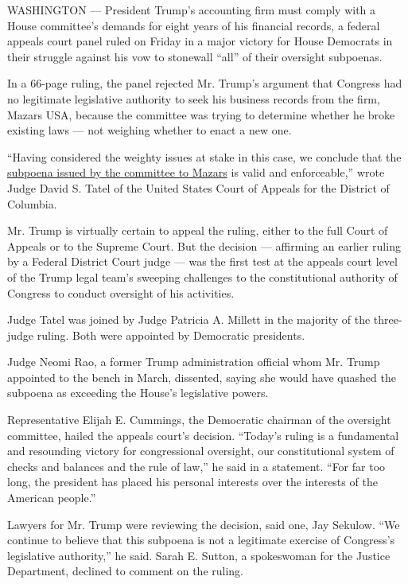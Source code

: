 WASHINGTON --- President Trump's accounting firm must comply with a
House committee's demands for eight years of his financial records, a
federal appeals court panel ruled on Friday in a major victory for House
Democrats in their struggle against his vow to stonewall ``all'' of
their oversight subpoenas.

In a 66-page ruling, the panel rejected Mr. Trump's argument that
Congress had no legitimate legislative authority to seek his business
records from the firm, Mazars USA, because the committee was trying to
determine whether he broke existing laws --- not weighing whether to
enact a new one.

``Having considered the weighty issues at stake in this case, we
conclude that the
\href{https://www.nytimes3xbfgragh.onion/2020/07/09/us/supreme-court-trump-tax-records.html}{subpoena
issued by the committee to Mazars} is valid and enforceable,'' wrote
Judge David S. Tatel of the United States Court of Appeals for the
District of Columbia.

Mr. Trump is virtually certain to appeal the ruling, either to the full
Court of Appeals or to the Supreme Court. But the decision --- affirming
an earlier ruling by a Federal District Court judge --- was the first
test at the appeals court level of the Trump legal team's sweeping
challenges to the constitutional authority of Congress to conduct
oversight of his activities.

Judge Tatel was joined by Judge Patricia A. Millett in the majority of
the three-judge ruling. Both were appointed by Democratic presidents.

Judge Neomi Rao, a former Trump administration official whom Mr. Trump
appointed to the bench in March, dissented, saying she would have
quashed the subpoena as exceeding the House's legislative powers.

Representative Elijah E. Cummings, the Democratic chairman of the
oversight committee, hailed the appeals court's decision. ``Today's
ruling is a fundamental and resounding victory for congressional
oversight, our constitutional system of checks and balances and the rule
of law,'' he said in a statement. ``For far too long, the president has
placed his personal interests over the interests of the American
people.''

Lawyers for Mr. Trump were reviewing the decision, said one, Jay
Sekulow. ``We continue to believe that this subpoena is not a legitimate
exercise of Congress's legislative authority,'' he said. Sarah E.
Sutton, a spokeswoman for the Justice Department, declined to comment on
the ruling.

